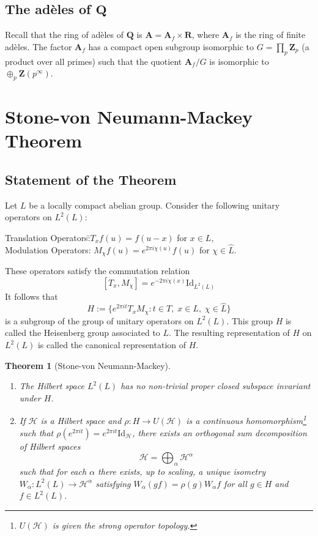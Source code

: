 \documentclass[11pt]{amsart}
\numberwithin{equation}{section}
\theoremstyle{plain}
\newtheorem*{theorem*}{Theorem}
\theoremstyle{definition}
\newcommand{\Hilb}{\mathcal H}
\newcommand{\Q}{\mathbf Q}
\newcommand{\R}{\mathbf R}
\newcommand{\Z}{\mathbf Z}
\begin{document}
\subsection{The ad\`eles of $\Q$}
\label{sec:adeles}
Recall that the ring of ad\`eles of $\Q$ is $\mathbf A=\mathbf A_f \times \R$, where $\mathbf A_f$ is the ring of finite ad\`eles.
The factor $\mathbf A_f$ has a compact open subgroup isomorphic to $G=\prod_p \Z_p$ (a product over all primes) such that the quotient $\mathbf A_f/G$ is isomorphic to $\oplus_p \Z(p^\infty)$.
\section{Stone-von Neumann-Mackey Theorem}
\label{sec:stone-von-neumann}
\subsection{Statement of the Theorem}
\label{sec:statement-theorem}
Let $L$ be a locally compact abelian group.
Consider the following unitary operators on $L^2(L)$:
\begin{tabbing}
  Translation Operators:\hspace{1cm}\=$T_x f(u)=f(u-x)$ for $x\in L$,\\
  Modulation Operators: \>$M_\chi f(u)=e^{2\pi i\chi(u)}f(u)$ for $\chi \in \hat L$.
\end{tabbing}
These operators satisfy the commutation relation
\begin{equation}
  \label{eq:commutation}
  [T_x,M_\chi]=e^{-2\pi i \chi(x)}\mathrm{Id}_{L^2(L)}
\end{equation}
It follows that
\begin{equation*}
  H:=\big\{ e^{2\pi it}T_x M_\chi:t\in T,\; x\in L,\; \chi\in \hat L\big\}
\end{equation*}
is a subgroup of the group of unitary operators on $L^2(L)$. This group $H$ is called the Heisenberg group associated to $L$.
The resulting representation of $H$ on $L^2(L)$ is called the canonical representation of $H$.
\begin{theorem*}
  [Stone-von Neumann-Mackey]
  \begin{enumerate}
  \item The Hilbert space $L^2(L)$ has no non-trivial proper closed subspace invariant under $H$.
  \item If $\Hilb$ is a Hilbert space and $\rho:H\to U(\Hilb)$ is a continuous homomorphism\footnote{$U(\Hilb)$ is given the strong operator topology.} such that $\rho(e^{2\pi it})=e^{2\pi it}\mathrm{Id}_\Hilb$, there exists an orthogonal sum decomposition of Hilbert spaces
    \begin{equation*}
      \Hilb=\bigoplus_{\alpha} \Hilb^\alpha
    \end{equation*}
    such that for each $\alpha$ there exists, up to scaling, a unique isometry $W_\alpha:L^2(L)\to \Hilb^\alpha$ satisfying $W_\alpha(g f)= \rho(g)W_\alpha f$ for all $g\in H$ and $f\in L^2(L)$.
  \end{enumerate}
\end{theorem*}
\end{document}
